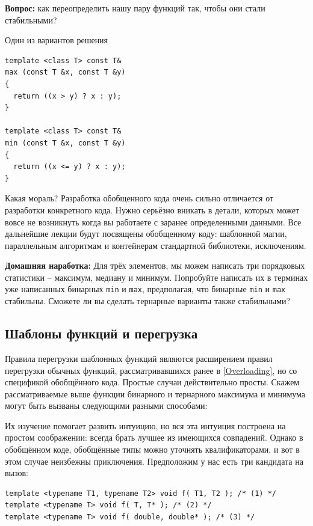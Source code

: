 \documentclass[a4paper,12pt,oneside]{article}
\begin{document}
\textbf{Вопрос:} как переопределить нашу пару функций так, чтобы они стали стабильными?

Один из вариантов решения

\begin{lstlisting}
template <class T> const T&
max (const T &x, const T &y)
{
  return ((x > y) ? x : y);
}

template <class T> const T&
min (const T &x, const T &y)
{
  return ((x <= y) ? x : y);
}
\end{lstlisting}

Какая мораль? Разработка обобщенного кода очень сильно отличается от разработки конкретного кода. Нужно серьёзно вникать в детали, которых может вовсе не возникнуть когда вы работаете с заранее определенными данными. Все дальнейшие лекции будут посвящены обобщенному коду: шаблонной магии, параллельным алгоритмам и контейнерам стандартной библиотеки, исключениям. 

\textbf{Домашняя наработка:} Для трёх элементов, мы можем написать три порядковых статистики -- максимум, медиану и минимум. Попробуйте написать их в терминах уже написанных бинарных \lstinline!min! и \lstinline!max!, предполагая, что бинарные \lstinline!min! и \lstinline!max! стабильны. Сможете ли вы сделать тернарные варианты также стабильными?

\subsection{Шаблоны функций и перегрузка}

Правила перегрузки шаблонных функций являются расширением правил перегрузки обычных функций, рассматривавшихся ранее в \ref{Overloading}, но со спецификой обобщённого кода. Простые случаи действительно просты. Скажем рассматриваемые выше функции бинарного и тернарного максимума и минимума могут быть вызваны следующими разными способами:



Их изучение помогает развить интуицию, но вся эта интуиция построена на простом соображении: всегда брать лучшее из имеющихся совпадений. Однако в обобщённом коде, обобщённые типы можно уточнять квалификаторами, и вот в этом случае неизбежны приключения. Предположим у нас есть три кандидата на вызов:

\begin{lstlisting}
template <typename T1, typename T2> void f( T1, T2 ); /* (1) */
template <typename T> void f( T, T* ); /* (2) */
template <typename T> void f( double, double* ); /* (3) */
\end{lstlisting}
\end{document}
